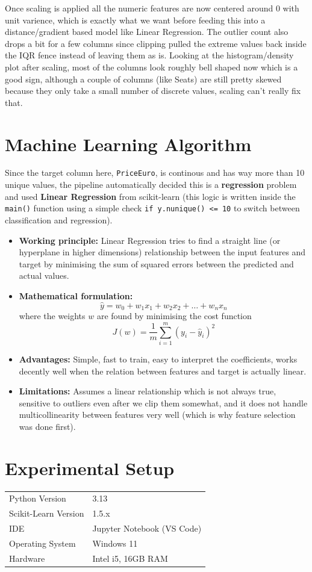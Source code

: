 \documentclass[12pt,a4paper]{article}
\begin{document}
Once scaling is applied all the numeric features are now centered around 0 with unit varience, which is exactly what we want before feeding this into a distance/gradient based model like Linear Regression. The outlier count also drops a bit for a few columns since clipping pulled the extreme values back inside the IQR fence instead of leaving them as is. Looking at the histogram/density plot after scaling, most of the columns look roughly bell shaped now which is a good sign, although a couple of columns (like Seats) are still pretty skewed because they only take a small number of discrete values, scaling can't really fix that.

\section{Machine Learning Algorithm}
Since the target column here, \texttt{PriceEuro}, is continous and has way more than 10 unique values, the pipeline automatically decided this is a \textbf{regression} problem and used \textbf{Linear Regression} from scikit-learn (this logic is written inside the \texttt{main()} function using a simple check \texttt{if y.nunique() <= 10} to switch between classification and regression).

\begin{itemize}
\item \textbf{Working principle:} Linear Regression tries to find a straight line (or hyperplane in higher dimensions) relationship between the input features and target by minimising the sum of squared errors between the predicted and actual values.
\item \textbf{Mathematical formulation:}
\[
\hat{y} = w_0 + w_1x_1 + w_2x_2 + \dots + w_nx_n
\]
where the weights $w$ are found by minimising the cost function
\[
J(w) = \frac{1}{m}\sum_{i=1}^{m}(y_i - \hat{y}_i)^2
\]
\item \textbf{Advantages:} Simple, fast to train, easy to interpret the coefficients, works decently well when the relation between features and target is actually linear.
\item \textbf{Limitations:} Assumes a linear relationship which is not always true, sensitive to outliers even after we clip them somewhat, and it does not handle multicollinearity between features very well (which is why feature selection was done first).
\end{itemize}

\section{Experimental Setup}
\begin{tabular}{ll}
\toprule
Python Version & 3.13 \\
Scikit-Learn Version & 1.5.x \\
IDE & Jupyter Notebook (VS Code) \\
Operating System & Windows 11 \\
Hardware & Intel i5, 16GB RAM \\
\bottomrule
\end{tabular}
\end{document}
